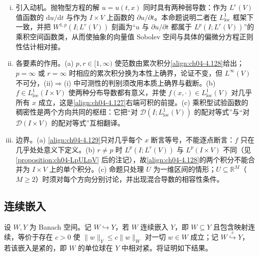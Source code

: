 \documentclass[../../main.tex]{subfiles}%
\begin{document}
\begin{remark}\label{remark:ch04-区间Sobolev动机}
\begin{enumerate}[(i)]
\item 引入动机。抛物型方程的解 $u=u(t,x)$ 同时具有两种弱导数：作为 $L^r(V)$ 值函数的 $\mathrm{d}u/\mathrm{d}t$ 与作为 $I\times V$ 上函数的 $\partial u/\partial t$。本命题说明二者在 $L^1_{\mathrm{loc}}$ 框架下一致，并把 $W^{1,p}(I;L^r(V))$ 刻画为“$u$ 与 $\partial u/\partial t$ 都属于 $L^p(I;L^r(V))$”的乘积空间函数类，从而使抽象的向量值 Sobolev 空间与具体的偏微分方程正则性估计相对接。

\item 各要素的作用。(a) $p,r\in[1,\infty)$ 使范数由累次积分\eqref{align:ch04-4.128}给出；$p=\infty$ 或 $r=\infty$ 时相应的累次积分换为本性上确界，论证不变，但 $L^\infty(V)$ 不可分，(ii)$\Rightarrow$(i) 中可测性的判别须改用本质上确界与截断。(b) $f\in L^1_{\mathrm{loc}}(I\times V)$ 使两种分布导数都有意义，并使 $f(x,\cdot)\in L^1_{\mathrm{loc}}(V)$ 对几乎所有 $x$ 成立，这是\eqref{align:ch04-4.127}右端可积的前提。(c) 乘积型试验函数的稠密性是两个方向共同的枢纽：它把“对 $\mathcal{D}(I;L^1_{\mathrm{loc}}(V))$ 的配对等式”与“对 $\mathcal{D}(I\times V)$ 的配对等式”互相翻译。

\item 边界。(a) \eqref{align:ch04-4.129}只对几乎每个 $x$ 断言等号，不能逐点断言：$f$ 只在几乎处处意义下定义。(b) $r\neq p$ 时 $L^p(I;L^r(V))$ 与 $L^p(I\times V)$ 不同（见\cref{proposition:ch04-LpULpV} 后的注记），故\eqref{align:ch04-4.128}的两个积分不能合并为 $I\times V$ 上的单个积分。(c) 命题只处理 $U$ 为一维区间的情形；$U\subseteq\mathbb{R}^M$（$M\geqslant2$）时须对每个方向分别讨论，并出现混合导数的相容性条件。
\end{enumerate}
\end{remark}

\subsection{连续嵌入}\label{subsection:ch04-连续嵌入}

设 $W,Y$ 为 Banach 空间。记 $W\hookrightarrow Y$，若 $W$ 连续嵌入 $Y$，即 $W\subseteq Y$ 且包含映射连续，等价于存在 $c>0$ 使 $\|w\|_Y\leqslant c\|w\|_W$ 对一切 $w\in W$ 成立；记 $W\overset{c}{\hookrightarrow}Y$，若该嵌入是紧的，即 $W$ 的单位球在 $Y$ 中相对紧。将证明如下结果。
\end{document}
